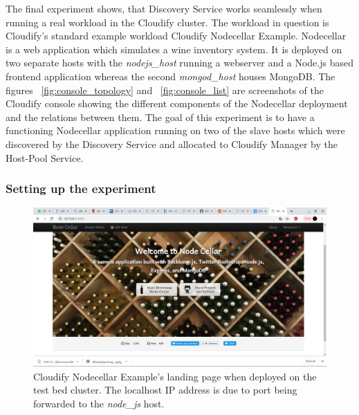 The final experiment shows, that Discovery Service works seamlessly when running a real workload in the Cloudify cluster. The workload in question is Cloudify's standard example workload Cloudify Nodecellar Example\cite{Nodecellar}. Nodecellar is a web application which simulates a wine inventory system. It is deployed on two separate hosts with the \textit{nodejs\_host} running a webserver and a Node.js based frontend application whereas the second \textit{mongod\_host} houses MongoDB. The figures ~\ref{fig:console_topology} and ~\ref{fig:console_list} are screenshots of the Cloudify console showing the different components of the Nodecellar deployment and the relations between them. The goal of this experiment is to have a functioning Nodecellar application running on two of the slave hosts which were discovered by the Discovery Service and allocated to Cloudify Manager by the Host-Pool Service.


\subsubsection*{Setting up the experiment}


 \begin{figure}[ht!]
\centering
  \includegraphics[width=\textwidth, keepaspectratio]{Nodecellarscreenshot.png}%
  \caption{Cloudify Nodecellar Example's landing page when deployed on the test bed cluster. The localhost IP address is due to port being forwarded to the \textit{node\_js} host.}
  \label{fig:nodecellar}
\end{figure}

